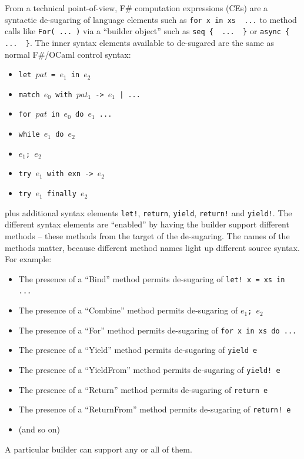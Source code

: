 \documentclass[acmsmall]{acmart}\settopmatter{}
\begin{document}
From a technical point-of-view, F\# computation expressions (CEs) are a syntactic de-sugaring of language elements
such as \verb!for x in xs  ...! to method calls like \verb!For( ... )! via a ``builder object'' such as \verb!seq {  ...  }! or \verb!async {  ...  }!. 
The inner syntax elements available to de-sugared are the same as normal F\#/OCaml
control syntax:
\begin{itemize}
\item \texttt{let $pat$ = $e_1$ in $e_2$}
\item \texttt{match $e_0$ with $pat_1$ -> $e_1$ | ...}
\item \texttt{for $pat$ in $e_0$ do  $e_1$ ... }
\item \texttt{while $e_1$ do  $e_2$ }
\item \texttt{$e_1$; $e_2$}
\item \texttt{try $e_1$ with exn -> $e_2$}
\item \texttt{try $e_1$ finally $e_2$}
\end{itemize}
plus additional syntax elements \texttt{let!}, \texttt{return}, \texttt{yield}, \texttt{return!} and \texttt{yield!}.
The different syntax elements are ``enabled'' by having the builder support different
methods – these methods from the target of the de-sugaring. The names of the methods matter, because different method
names light up different source syntax. For example:
\begin{itemize}
\item The presence of a ``Bind'' method permits de-sugaring of \texttt{let! x = xs in  ... }
\item The presence of a ``Combine'' method permits de-sugaring of \texttt{$e_1$; $e_2$}
\item The presence of a ``For'' method permits de-sugaring of \texttt{for x in xs do  ...}
\item The presence of a ``Yield'' method permits de-sugaring of \texttt{yield e}
\item The presence of a ``YieldFrom'' method permits de-sugaring of \texttt{yield! e}
\item The presence of a ``Return'' method permits de-sugaring of \texttt{return e}
\item The presence of a ``ReturnFrom'' method permits de-sugaring of \texttt{return! e}
\item (and so on)
\end{itemize}
A particular builder can support any or all of them.
\end{document}
